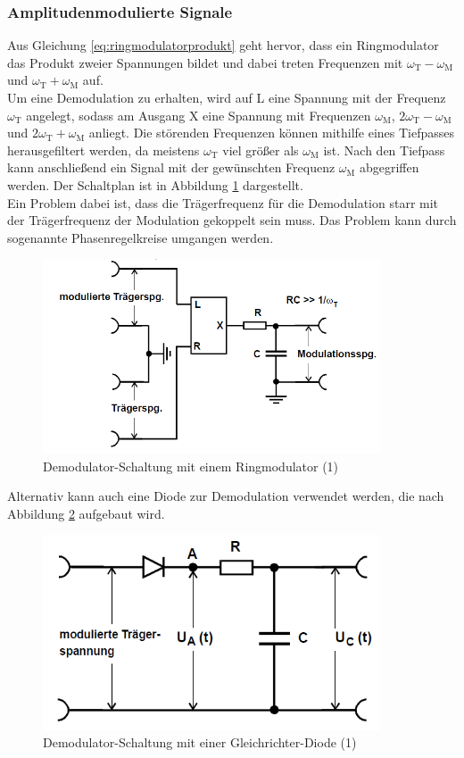 \documentclass[]{scrartcl}
\begin{document}
\subsubsection*{Amplitudenmodulierte Signale}
Aus Gleichung \ref{eq:ringmodulatorprodukt} geht hervor, dass ein Ringmodulator das Produkt zweier Spannungen bildet und dabei treten Frequenzen mit $\omega_{\text{T}}-\omega_{\text{M}}$ und $\omega_{\text{T}}+\omega_{\text{M}}$ auf.\\
Um eine Demodulation zu erhalten, wird auf L eine Spannung mit der Frequenz $\omega_{\text{T}}$ angelegt, sodass am Ausgang X eine Spannung mit Frequenzen $\omega_{\text{M}}$, $2\omega_{\text{T}}-\omega_{\text{M}}$ und $2\omega_{\text{T}}+\omega_{\text{M}}$ anliegt. Die störenden Frequenzen können mithilfe eines Tiefpasses herausgefiltert werden, da meistens $\omega_{\text{T}}$ viel größer als $\omega_{\text{M}}$ ist. Nach den Tiefpass kann anschließend ein Signal mit der gewünschten Frequenz $\omega_{\text{M}}$ abgegriffen werden. Der Schaltplan ist in Abbildung \ref{fig:demodulationsschaltungmitringmodulator} dargestellt.\\
Ein Problem dabei ist, dass die Trägerfrequenz für die Demodulation starr mit der Trägerfrequenz der Modulation gekoppelt sein muss. Das Problem kann durch sogenannte Phasenregelkreise umgangen werden.
\begin{figure}[H]
\centering 
\includegraphics[width=10cm]{images/demodulationsschaltungmitringmodulator.png}
\caption{Demodulator-Schaltung mit einem Ringmodulator (1)}
\label{fig:demodulationsschaltungmitringmodulator}
\end{figure} 
Alternativ kann auch eine Diode zur Demodulation verwendet werden, die nach Abbildung \ref{fig:demodulationsschaltungmitgleichrichtdiode} aufgebaut wird.
\begin{figure}[H]
\centering 
\includegraphics[width=10cm]{images/demodulationsschaltungmitgleichrichtdiode.png}
\caption{Demodulator-Schaltung mit einer Gleichrichter-Diode (1)}
\label{fig:demodulationsschaltungmitgleichrichtdiode}
\end{figure}
\end{document}

